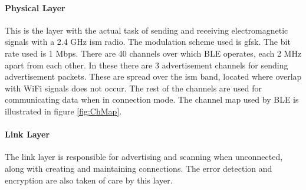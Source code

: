 \paragraph{Physical Layer}
This is the layer with the actual task of sending and receiving electromagnetic signals with a 2.4 GHz \gls{ism} radio. The modulation scheme used is \gls{gfsk}. The bit rate used is 1 Mbps. There are 40 channels over which BLE operates, each 2 MHz apart from each other. In these there are 3 advertisement channels for sending advertisement packets. These are spread over the \gls{ism} band, located where overlap with WiFi signals does not occur. The rest of the channels are used for communicating data when in connection mode. The channel map used by BLE is illustrated in figure \ref{fig:ChMap}.

\paragraph{Link Layer}
The link layer is responsible for advertising and scanning when unconnected, along with creating and maintaining connections. The error detection and encryption are also taken of care by this layer. 

